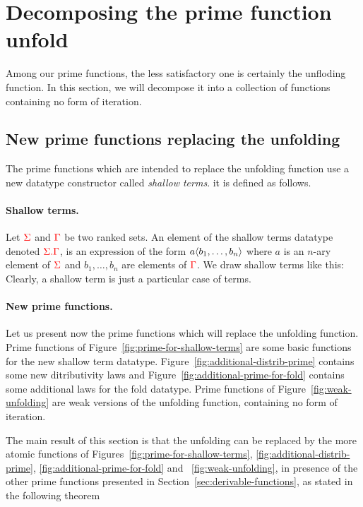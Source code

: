 \section{Decomposing the prime function unfold}
\label{ap:matrix-power}
\newcommand{\treeunfold}{\mathrm{unfold}}

Among our prime functions, the less satisfactory one is certainly the unfloding function. In this section, we will decompose it into a collection of functions containing no form of iteration. 



\subsection{New prime functions replacing the unfolding}\label{sec:functions-decomposing-unfolding}

The prime functions which are intended to replace the unfolding function use a new datatype constructor called \emph{shallow terms}. it is defined as follows.  

\paragraph*{Shallow terms.} Let ${\color{red}{\Sigma}}$ and ${\color{red}{\Gamma}}$ be two ranked sets. An element of the shallow terms datatype denoted ${\color{red}{{\color{red}{\Sigma}}. {\color{red}{\Gamma}}}}$, is an expression of the form $a\langle{b_1,\dots,b_n}\rangle$ where $a$ is an $n$-ary element of ${\color{red}{\Sigma}}$ and $b_1,\dots, b_n$ are elements of ${\color{red}{\Gamma}}$. We draw shallow terms like this:
Clearly, a shallow term is just a particular case of terms.

\paragraph*{New prime functions.} Let us present now the prime functions which will replace the unfolding function. Prime functions of Figure~\ref{fig:prime-for-shallow-terms} are some basic functions for the new shallow term datatype. Figure~\ref{fig:additional-distrib-prime} contains some new ditributivity laws and Figure~\ref{fig:additional-prime-for-fold} contains some additional laws for the fold datatype. Prime functions of Figure~\ref{fig:weak-unfolding} are weak versions of the unfolding function, containing no form of iteration. 




The main result of this section is that the unfolding can be replaced by the more atomic functions of Figures~\ref{fig:prime-for-shallow-terms}, \ref{fig:additional-distrib-prime}, \ref{fig:additional-prime-for-fold} and ~\ref{fig:weak-unfolding}, in  presence of the other prime functions presented in Section~\ref{sec:derivable-functions}, as stated in the following theorem
 
